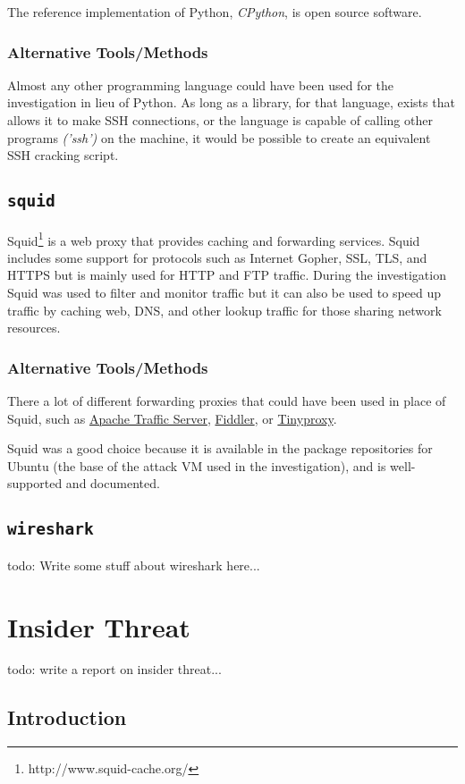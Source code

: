 \documentclass[12pt]{report}
\begin{document}
The reference implementation of Python, \textit{CPython}, is open source software.
\subsection*{Alternative Tools/Methods}
Almost any other programming language could have been used for the investigation in lieu of Python. As long as a library, for that language, exists that allows it to make SSH connections, or the language is capable of calling other programs \textit{('ssh')} on the machine, it would be possible to create an equivalent SSH cracking script.

\section{\texttt{squid}}
Squid\footnote{http://www.squid-cache.org/} is a web proxy that provides caching and forwarding services. Squid includes some support for protocols such as Internet Gopher, SSL, TLS, and HTTPS but is mainly used for HTTP and FTP traffic. During the investigation Squid was used to filter and monitor traffic but it can also be used to speed up traffic by caching web, DNS, and other lookup traffic for those sharing network resources.
\subsection*{Alternative Tools/Methods}
There a lot of different forwarding proxies that could have been used in place of Squid, such as \href{https://docs.trafficserver.apache.org/en/5.3.x/admin/forward-proxy.en.html}{Apache Traffic Server}, \href{https://www.telerik.com/fiddler}{Fiddler}, or \href{https://tinyproxy.github.io/}{Tinyproxy}.

Squid was a good choice because it is available in the package repositories for Ubuntu (the base of the attack VM used in the investigation), and is well-supported and documented.

\section{\texttt{wireshark}}
todo: Write some stuff about wireshark here...


\pagebreak
\chapter{Insider Threat}
todo: write a report on insider threat...
\section{Introduction}
\end{document}
